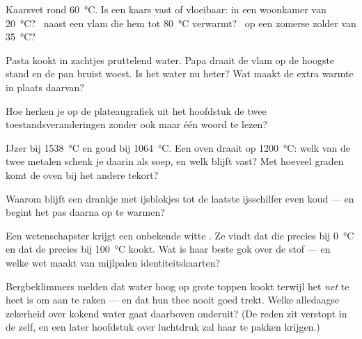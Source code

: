 \begin{exercise}[$\star$]\label{exo:g4:changes-of-state:5}
Kaarsvet  rond \qty{60}{\celsius}. Is een kaars vast of
vloeibaar: in een woonkamer van \qty{20}{\celsius}? \ naast een vlam
die hem tot \qty{80}{\celsius} verwarmt? \ op een zomerse zolder van
\qty{35}{\celsius}?
\end{exercise}

\begin{exercise}[$\star$]\label{exo:g4:changes-of-state:6}
Pasta kookt in zachtjes pruttelend water. Papa draait de vlam op de
hoogste stand en de pan bruist woest. Is het water nu heter? Wat maakt
de extra warmte in plaats daarvan?
\end{exercise}

\begin{exercise}[$\star$]\label{exo:g4:changes-of-state:7}
Hoe herken je op de plateaugrafiek uit het hoofdstuk de twee
toestandsveranderingen zonder ook maar één woord te lezen?
\end{exercise}

\begin{exercise}[$\star$]\label{exo:g4:changes-of-state:8}
IJzer  bij \qty{1538}{\celsius} en goud bij
\qty{1064}{\celsius}. Een oven draait op \qty{1200}{\celsius}: welk
van de twee metalen schenk je daarin als soep, en welk blijft
vast? Met hoeveel graden komt de oven bij het andere tekort?
\end{exercise}

\begin{exercise}[$\star$]\label{exo:g4:changes-of-state:9}
Waarom blijft een drankje met ijsblokjes tot de laatste ijsschilfer
even koud --- en begint het pas daarna op te warmen?
\end{exercise}

\begin{exercise}[$\star\star$]\label{exo:g4:changes-of-state:10}
Een wetenschapster krijgt een onbekende witte . Ze vindt
dat die precies bij \qty{0}{\celsius}  en dat de 
precies bij \qty{100}{\celsius} kookt. Wat is haar beste gok over de
stof --- en welke wet maakt van mijlpalen identiteitskaarten?
\end{exercise}

\begin{exercise}[$\star\star$]\label{exo:g4:changes-of-state:11}
Bergbeklimmers melden dat water hoog op grote toppen kookt terwijl het
\emph{net} te heet is om aan te raken --- en dat hun thee nooit goed
trekt. Welke alledaagse zekerheid over kokend water gaat daarboven
onderuit? (De reden zit verstopt in de  zelf, en een later
hoofdstuk over luchtdruk zal haar te pakken krijgen.)
\end{exercise}
